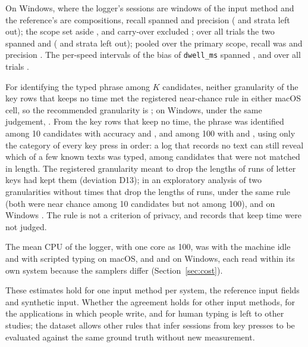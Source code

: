 On Windows, where the logger's sessions are windows of the input method and the reference's are compositions, recall
spanned  and precision 
( and  strata left
out); the scope set aside , and carry-over excluded
; over all trials the two spanned  and
 ( and
 strata left out); pooled over the primary scope, recall was
 and precision
. The per-speed intervals of the bias of \texttt{dwell\_ms}
spanned , and over all trials .

For identifying the typed phrase among $K$ candidates, neither granularity of the key rows that keeps no time met the
registered near-chance rule in either macOS cell, so the recommended granularity is ; on Windows,
under the same judgement, . From the key rows that keep no time, the phrase was identified
among 10 candidates with accuracy  and
, and among 100 with 
and , using only the category of every key press in order: a log
that records no text can still reveal which of a few known texts was typed, among candidates that were not matched in
length. The registered granularity meant to drop the lengths of runs of letter keys had kept them (deviation D13); in an
exploratory analysis of two granularities without times that drop the lengths of runs,  under the
same rule (both were near chance among 10 candidates but not among 100), and on Windows . The rule is
not a criterion of privacy, and
records that keep time were not judged.

The mean CPU of the logger, with one core as 100, was  with the machine idle and
 with scripted typing on macOS, and  and
 on Windows, each read within its own system because the samplers differ
(Section~\ref{sec:cost}).

These estimates hold for one input method per system, the reference input fields and synthetic input. Whether the
agreement holds for other input methods, for the applications in which people write, and for human typing is left to
other studies; the dataset allows other rules that infer sessions from key presses to be evaluated against the same
ground truth without new measurement.
